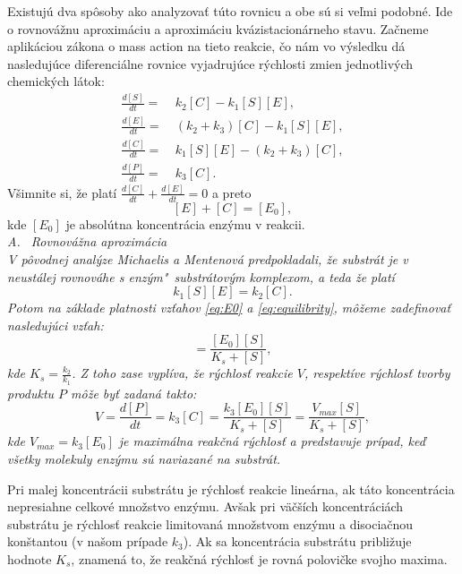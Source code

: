 \documentclass[11pt,final,oneside]{fithesis}
\begin{document}
Existuj\'u dva sp\^ osoby ako analyzova\v t t\'uto rovnicu a obe s\'u si ve\v lmi podobn\'e. Ide o rovnov\'a\v znu aproxim\'aciu a aproxim\'aciu 
kv\'azistacion\'arneho stavu. Za\v cneme aplik\'aciou z\'akona o mass action na tieto reakcie, \v co n\'am vo v\'ysledku d\'a nasleduj\'uce diferenci\'alne
rovnice vyjadruj\'uce r\'ychlosti zmien jednotliv\'ych chemick\'ych l\'atok:
\begin{align}
\frac{d[S]}{dt} =& \ k_2[C] - k_1[S][E],\\
\frac{d[E]}{dt} =& \ (k_2 + k_3)[C] - k_1[S][E],\\
\frac{d[C]}{dt} =& \ k_1[S][E] - (k_2 + k_3)[C],\\
\frac{d[P]}{dt} =& \ k_3[C].
\end{align}
V\v simnite si, \v ze plat\'i $\frac{d[C]}{dt} + \frac{d[E]}{dt} = 0$ a preto 
\begin{equation}
\label{eq:E0}
[E] + [C] = [E_0], 
\end{equation}
kde $[E_0]$ je absol\'utna koncentr\'acia enz\'ymu v reakcii. \cite{Keener:1998:MP:Enzymes}\\

\noindent
\it A. \ Rovnov\'a\v zna aproxim\'acia\rm
\\

V p\^ ovodnej anal\'yze Michaelis a Mentenov\'a predpokladali, \v ze substr\'at je v neust\'alej rovnov\'ahe s enz\'ym"~substr\'atov\'ym komplexom, 
a teda \v ze plat\'i 
\begin{equation}
\label{eq:equilibrity}
k_1[S][E] = k_2[C].
\end{equation}
Potom na z\'aklade platnosti vz\v tahov \ref{eq:E0} a \ref{eq:equilibrity}, m\^ o\v zeme zadefinova\v t nasleduj\'uci vz\v tah:
\begin{equation}
[C] = \frac{[E_0][S]}{K_s + [S]},
\end{equation}
kde $K_s = \frac{k_2}{k_1}$. Z toho zase vypl\'iva, \v ze r\'ychlos\v t reakcie $V$, respekt\'ive r\'ychlos\v t tvorby produktu $P$ m\^ o\v ze by\v t 
zadan\'a takto:
\begin{equation}
\label{eq:ks}
V = \frac{d[P]}{dt} = k_3[C] = \frac{k_3[E_0][S]}{K_s + [S]} = \frac{V_{max}[S]}{K_s + [S]},
\end{equation}
kde $V_{max} = k_3[E_0]$ je maxim\'alna reak\v cn\'a r\'ychlos\v t a predstavuje pr\'ipad, ke\v d v\v setky molekuly enz\'ymu s\'u naviazan\'e na substr\'at.

Pri malej koncentr\'acii substr\'atu je r\'ychlos\v t reakcie line\'arna, ak t\'ato koncentr\'acia nepresiahne celkov\'e mno\v zstvo enz\'ymu. Av\v sak pri
v\"a\v c\v s\'ich koncentr\'aci\'ach substr\'atu je r\'ychlos\v t reakcie limitovan\'a mno\v zstvom enz\'ymu a disocia\v cnou kon\v stantou 
(v na\v som pr\'ipade $k_3$). Ak sa koncentr\'acia substr\'atu pribli\v zuje hodnote $K_s$, znamen\'a to, \v ze reak\v cn\'a r\'ychlos\v t je rovn\'a 
polovi\v cke svojho maxima.
\end{document}
